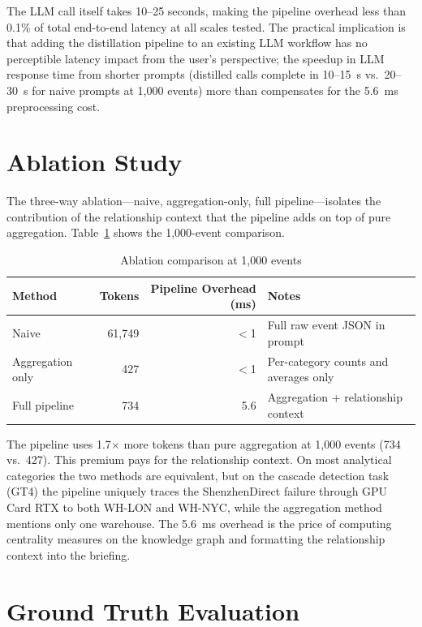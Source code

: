 The LLM call itself takes 10--25 seconds, making the pipeline overhead less than 0.1\% of
total end-to-end latency at all scales tested. The practical implication is that adding the
distillation pipeline to an existing LLM workflow has no perceptible latency impact from
the user's perspective; the speedup in LLM response time from shorter prompts (distilled
calls complete in 10--15~s vs.\ 20--30~s for naive prompts at 1,000 events) more than
compensates for the 5.6~ms preprocessing cost.

\section{Ablation Study}
\label{sec:ablation}

The three-way ablation---naive, aggregation-only, full pipeline---isolates the contribution
of the relationship context that the pipeline adds on top of pure aggregation.
Table~\ref{tab:ablation} shows the 1,000-event comparison.

\begin{table}[H]
\centering
\caption{Ablation comparison at 1,000 events}
\label{tab:ablation}
\begin{tabular}{lrrl}
\toprule
\textbf{Method} & \textbf{Tokens} & \textbf{Pipeline Overhead (ms)} & \textbf{Notes} \\
\midrule
Naive            & 61,749 & $<$1  & Full raw event JSON in prompt \\
Aggregation only & 427    & $<$1  & Per-category counts and averages only \\
Full pipeline    & 734    & 5.6   & Aggregation + relationship context \\
\bottomrule
\end{tabular}
\end{table}

The pipeline uses 1.7$\times$ more tokens than pure aggregation at 1,000 events (734 vs.\
427). This premium pays for the relationship context. On most analytical categories the
two methods are equivalent, but on the cascade detection task (GT4) the pipeline uniquely
traces the ShenzhenDirect failure through GPU Card RTX to both WH-LON and WH-NYC, while
the aggregation method mentions only one warehouse. The 5.6~ms overhead is the price of
computing centrality measures on the knowledge graph and formatting the relationship
context into the briefing.

\section{Ground Truth Evaluation}
\label{sec:ground_truth}

